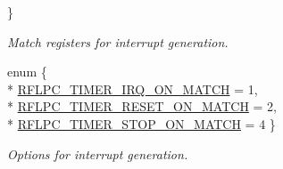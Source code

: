 \begin{DoxyCompactItemize}
 \}
\begin{DoxyCompactList}\small\item\em Match registers for interrupt generation. \end{DoxyCompactList}\item 
enum \{ \\*
\hyperlink{group__timer_gga06fc87d81c62e9abb8790b6e5713c55ba74a5c05f16f3840e59072e5876aa3696}{R\-F\-L\-P\-C\-\_\-\-T\-I\-M\-E\-R\-\_\-\-I\-R\-Q\-\_\-\-O\-N\-\_\-\-M\-A\-T\-C\-H} =  1, 
\\*
\hyperlink{group__timer_gga06fc87d81c62e9abb8790b6e5713c55bab7c018a7a66bfd59c5fd7d88ca50c669}{R\-F\-L\-P\-C\-\_\-\-T\-I\-M\-E\-R\-\_\-\-R\-E\-S\-E\-T\-\_\-\-O\-N\-\_\-\-M\-A\-T\-C\-H} =  2, 
\\*
\hyperlink{group__timer_gga06fc87d81c62e9abb8790b6e5713c55ba6eccf4b61667dfffc4d2850a10495480}{R\-F\-L\-P\-C\-\_\-\-T\-I\-M\-E\-R\-\_\-\-S\-T\-O\-P\-\_\-\-O\-N\-\_\-\-M\-A\-T\-C\-H} =  4
 \}
\begin{DoxyCompactList}\small\item\em Options for interrupt generation. \end{DoxyCompactList}\end{DoxyCompactItemize}
